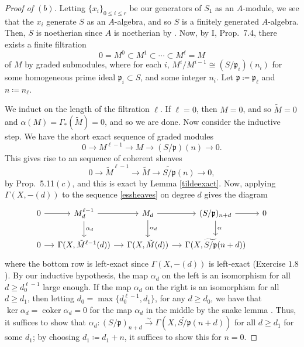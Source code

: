 \documentclass[10pt]{article}
\theoremstyle{definition}
\theoremstyle{remark}
\numberwithin{equation}{section}
\numberwithin{figure}{subsubsection}
\DeclareMathOperator{\Coker}{coker}
\newcommand{\isoto}{\overset{\sim}{\to}}
\begin{document}
\begin{proof}[Proof of $(b)$]
  Letting $\{x_i\}_{0 \le i \le r}$ be our generators of $S_1$ as an $A$-module, we see that the $x_i$ generate $S$ as an $A$-algebra, and so $S$ is a finitely generated $A$-algebra. Then, $S$ is noetherian since $A$ is noetherian by \cite[Cor.~7.7]{AM69}. Now, by I, Prop.~7.4, there exists a finite filtration
  \begin{equation*}
    0 = M^0 \subset M^1 \subset \cdots \subset M^\ell = M
  \end{equation*}
  of $M$ by graded submodules, where for each $i$, $M^i/M^{i-1} \cong (S/\mathfrak{p}_i)(n_i)$ for some homogeneous prime ideal $\mathfrak{p}_i \subset S$, and some integer $n_i$. Let $\mathfrak{p} \coloneqq \mathfrak{p}_\ell$ and $n \coloneqq n_\ell$.
  \par We induct on the length of the filtration $\ell$. If $\ell = 0$, then $M = 0$, and so $\tilde{M} = 0$ and $\alpha(M) = \Gamma_*(\tilde{M}) = 0$, and so we are done. Now consider the inductive step. We have the short exact sequence of graded modules
  \begin{equation*}
    0 \longrightarrow M^{\ell-1} \longrightarrow M \longrightarrow (S/\mathfrak{p})(n) \longrightarrow 0.
  \end{equation*}
  This gives rise to an sequence of coherent sheaves
  \begin{equation}\label{essheaves}
    0 \longrightarrow \tilde{M}^{\ell-1} \longrightarrow \tilde{M} \longrightarrow \widetilde{S/\mathfrak{p}}(n) \longrightarrow 0,
  \end{equation}
  by Prop.~5.11$(c)$, and this is exact by Lemma \ref{tildeexact}. Now, applying $\Gamma(X,-(d))$ to the sequence \eqref{essheaves} on degree $d$ gives the diagram
  \begin{equation*}
    \begin{tikzcd}[column sep=small]
      0 \rar & M^{\ell-1}_d \rar\dar{\alpha_d} & M_d \rar\dar{\alpha_d} & (S/\mathfrak{p})_{n+d} \rar\dar{\alpha} & 0\\
      0 \rar & \Gamma(X,\tilde{M}^{\ell-1}(d)) \rar & \Gamma(X,\tilde{M}(d)) \rar & \Gamma(X,\widetilde{S/\mathfrak{p}}(n+d))
    \end{tikzcd}
  \end{equation*}
  where the bottom row is left-exact since $\Gamma(X,-(d))$ is left-exact
  (Exercise $1.8$). By our inductive hypothesis, the map $\alpha_d$ on the left is an isomorphism for all $d \ge d_{0}^{\ell-1}$ large enough. If the map $\alpha_d$ on the right is an isomorphism for all $d \ge d_1$, then letting $d_0 = \max\{d_0^{\ell-1},d_1\}$, for any $d \ge d_0$, we have that $\ker \alpha_d = \Coker \alpha_d = 0$ for the map $\alpha_d$ in the middle by the snake lemma \cite[Prop.~2.10]{AM69}. Thus, it suffices to show that $\alpha_d\colon(S/\mathfrak{p})_{n+d} \isoto \Gamma(X,\widetilde{S/\mathfrak{p}}(n+d))$ for all $d \ge d_1$ for some $d_1$; by choosing $d_1 \coloneqq d_1 + n$, it suffices to show this for $n=0$.

\end{proof}
\end{document}
